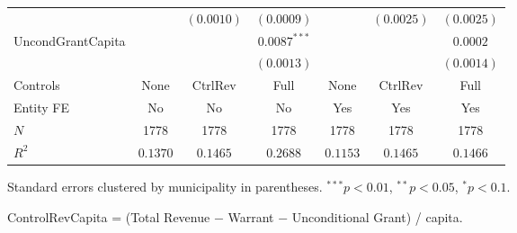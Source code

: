 \documentclass[border=10pt,varwidth=25cm]{standalone}
\renewenvironment{table}[1][]{}{}
\begin{document}
\begin{table}[H]
\begin{minipage}{\textwidth}
\begin{tabular}{lcccccc}
         &  & $(0.0010)$ & $(0.0009)$ &  & $(0.0025)$ & $(0.0025)$ \\[4pt]
        UncondGrantCapita &  &  & $0.0087^{***}$ &  &  & $0.0002$ \\
         &  &  & $(0.0013)$ &  &  & $(0.0014)$ \\[4pt]
        \midrule
        Controls & None & CtrlRev & Full & None & CtrlRev & Full \\
        Entity FE & No & No & No & Yes & Yes & Yes \\
        $N$ & 1778 & 1778 & 1778 & 1778 & 1778 & 1778 \\
        $R^2$ & $0.1370$ & $0.1465$ & $0.2688$ & $0.1153$ & $0.1465$ & $0.1466$ \\
        \bottomrule
    \end{tabular}

    \vspace{6pt}
    {\scriptsize Standard errors clustered by municipality in parentheses. $^{***}p<0.01$, $^{**}p<0.05$, $^{*}p<0.1$.}

    {\scriptsize ControlRevCapita = (Total Revenue $-$ Warrant $-$ Unconditional Grant) / capita.}
    \end{minipage}
\end{table}
\end{document}
